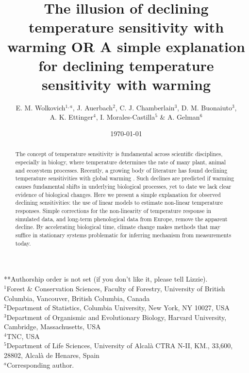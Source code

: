 \documentclass[11pt,letter]{article}
\begin{document}
\title{The illusion of declining temperature sensitivity with warming OR A simple explanation for declining temperature sensitivity with warming} %
\author{E. M. Wolkovich$^{1,a}$,  J. Auerbach$^{2}$, C. J. Chamberlain$^{3}$, D. M. Buonaiuto$^{3}$, \\ A. K. Ettinger$^4$, I. Morales-Castilla$^{5}$ \& A. Gelman$^{6}$} 

\date{\today} 
\maketitle
**Authorship order is not set (if you don't like it, please tell Lizzie).\\
$^1$Forest \& Conservation Sciences, Faculty of Forestry, University of British Columbia, Vancouver, British Columbia, Canada\\
$^2$Department of Statistics, Columbia University, New York, NY 10027, USA\\
$^3$Department of Organismic and Evolutionary Biology, Harvard University, Cambridge, Massachusetts, USA\\
$^4$TNC, USA\\
$^5$Department of Life Sciences, University of Alcal\`a CTRA N-II, KM., 33,600, 28802, Alcal\`a de Henares, Spain\\
$^a$Corresponding author.


\begin{abstract} %
The concept of temperature sensitivity is fundamental across scientific disciplines, especially in biology, where temperature determines the rate of many plant, animal and ecosystem processes. Recently, a growing body of literature has found declining temperature sensitivities with global warming \citep{fu2015,gusewell2017,piao2017,dai2019ag}. Such declines are predicted if warming causes fundamental shifts in underlying biological processes, yet to date we lack clear evidence of biological changes. Here we present a simple explanation for observed declining sensitivities: the use of linear models to estimate non-linear temperature responses. Simple corrections for the non-linearity of temperature response in simulated data, and long-term phenological data from Europe, remove the apparent decline. By accelerating biological time, climate change makes methods that may suffice in stationary systems problematic for inferring mechanism from measurements today. 
\end{abstract}
\end{document}
